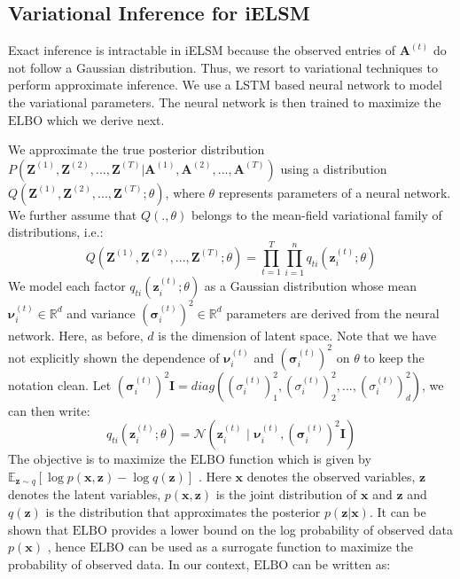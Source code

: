 \documentclass[letterpaper]{article}
\begin{document}
\subsection{Variational Inference for iELSM}
\label{section:variationalinferenceforsELSM}
Exact inference is intractable in iELSM because the observed entries of $\mathbf{A}^{(t)}$ do not follow a Gaussian distribution. Thus, we resort to variational techniques \cite{BleiEtAl:2017:VariationalInferenceAReviewForStatisticians} to perform approximate inference. We use a LSTM based neural network to model the variational parameters. The neural network is then trained to maximize the $\mathrm{ELBO}$ which we derive next.

We approximate the true posterior distribution $P(\mathbf{Z}^{(1)}, \mathbf{Z}^{(2)}, ..., \mathbf{Z}^{(T)} | \mathbf{A}^{(1)}, \mathbf{A}^{(2)}, ..., \mathbf{A}^{(T)})$ using a distribution $Q(\mathbf{Z}^{(1)}, \mathbf{Z}^{(2)}, ..., \mathbf{Z}^{(T)}; \theta)$, where $\theta$ represents parameters of a neural network. We further assume that $Q(., \theta)$ belongs to the mean-field variational family of distributions, i.e.:
\begin{equation}
    \label{eq:meanfield}
    Q(\mathbf{Z}^{(1)}, \mathbf{Z}^{(2)}, ..., \mathbf{Z}^{(T)}; \theta) = \prod_{t = 1}^{T} \prod_{i=1}^{{n}} q_{ti}(\mathbf{z}_i^{(t)}; \theta)
\end{equation}
We model each factor $q_{ti}(\mathbf{z}_i^{(t)}; \theta)$ as a Gaussian distribution whose mean $\bm{\nu}_i^{(t)} \in \mathbb{R}^d$ and variance ${(\bm{\sigma}_i^{(t)})^2} \in \mathbb{R}^d$ parameters are derived from the neural network. Here, as before, $d$ is the dimension of latent space. Note that we have not explicitly shown the dependence of $\bm{\nu}_i^{(t)}$ and ${(\bm{\sigma}_i^{(t)})^2}$ on $\theta$ to keep the notation clean. Let ${(\bm{\sigma}_i^{(t)})^2} \mathbf{I} = diag((\sigma_i^{(t)})_1^2, (\sigma_i^{(t)})_2^2, ..., (\sigma_i^{(t)})_d^2)$, we can then write:
\begin{equation}
    \label{eq:meanfieldfactordefinition}
    q_{ti}(\mathbf{z}_i^{(t)}; \theta) = \mathcal{N}(\mathbf{z}_i^{(t)} \,\,|\,\, \bm{\nu}_i^{(t)},  {(\bm{\sigma}_i^{(t)})^2} \mathbf{I})
\end{equation}
The objective is to maximize the $\mathrm{ELBO}$ function which is given by $\mathbb{E}_{\mathbf{z} \sim q}[\log p(\mathbf{x}, \mathbf{z}) - \log q(\mathbf{z})]$ \cite{BleiEtAl:2017:VariationalInferenceAReviewForStatisticians}. Here $\mathbf{x}$ denotes the observed variables, $\mathbf{z}$ denotes the latent variables, $p(\mathbf{x}, \mathbf{z})$ is the joint distribution of $\mathbf{x}$ and $\mathbf{z}$ and $q(\mathbf{z})$ is the distribution that approximates the posterior $p(\mathbf{z}|\mathbf{x})$. It can be shown that $\mathrm{ELBO}$ provides a lower bound on the log probability of observed data $p(\mathbf{x})$ \cite{KingmaEtAl:2013:AutoEncodingVariationalBayes}, hence $\mathrm{ELBO}$ can be used as a surrogate function to maximize the probability of observed data. In our context, $\mathrm{ELBO}$ can be written as:
\end{document}

